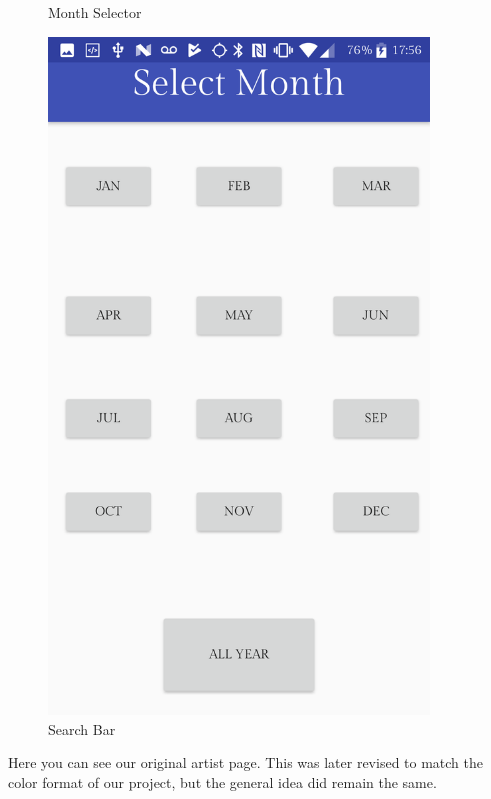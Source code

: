 \documentclass{article}
\begin{document}
\begin{figure}[H]
\begin{minipage}{.5\textwidth}
    \caption{Month Selector}
    \label{label}
  \end{minipage}%
  \begin{minipage}{.5\textwidth}
    \centering
    \includegraphics[width=0.9\textwidth]{Original_Month_Selector.png}
    \caption{Search Bar}
    \label{fig:ER}
  \end{minipage}
\end{figure}
Here you can see our original artist page. This was later revised to match the color format of our project, but the general idea did remain the same.
\end{document}
